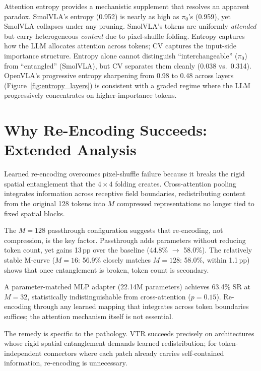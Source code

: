 Attention entropy provides a mechanistic supplement that resolves an apparent paradox. SmolVLA's entropy (0.952) is nearly as high as $\pi_{0}$'s (0.959), yet SmolVLA collapses under any pruning. SmolVLA's tokens are uniformly \emph{attended} but carry heterogeneous \emph{content} due to pixel-shuffle folding. Entropy captures how the LLM allocates attention across tokens; CV captures the input-side importance structure. Entropy alone cannot distinguish ``interchangeable'' ($\pi_{0}$) from ``entangled'' (SmolVLA), but CV separates them cleanly (0.038 vs.\ 0.314). OpenVLA's progressive entropy sharpening from 0.98 to 0.48 across layers (Figure~\ref{fig:entropy_layers}) is consistent with a graded regime where the LLM progressively concentrates on higher-importance tokens.


\section{Why Re-Encoding Succeeds: Extended Analysis}
\label{app:reencoding_analysis}
\label{sec:learned_compression}

Learned re-encoding overcomes pixel-shuffle failure because it breaks the rigid spatial entanglement that the $4 \times 4$ folding creates. Cross-attention pooling integrates information across receptive field boundaries, redistributing content from the original 128 tokens into $M$ compressed representations no longer tied to fixed spatial blocks.

The $M{=}128$ passthrough configuration suggests that re-encoding, not compression, is the key factor. Passthrough adds parameters without reducing token count, yet gains 13\,pp over the baseline (44.8\% $\to$ 58.0\%). The relatively stable M-curve ($M{=}16$: 56.9\% closely matches $M{=}128$: 58.0\%, within 1.1\,pp) shows that once entanglement is broken, token count is secondary.

A parameter-matched MLP adapter (22.14M parameters) achieves 63.4\% SR at $M{=}32$, statistically indistinguishable from cross-attention ($p = 0.15$). Re-encoding through any learned mapping that integrates across token boundaries suffices; the attention mechanism itself is not essential.

The remedy is specific to the pathology. VTR succeeds precisely on architectures whose rigid spatial entanglement demands learned redistribution; for token-independent connectors where each patch already carries self-contained information, re-encoding is unnecessary.


